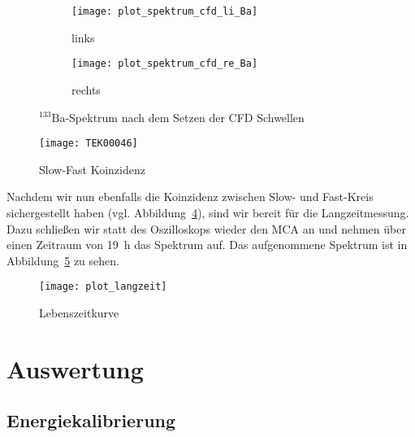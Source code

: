 \documentclass[11pt, ngerman, fleqn, DIV=15, headinclude, BCOR=2cm]{scrreprt}
\begin{document}
\begin{figure}
	\centering
	\begin{subfigure}{0.49 \textwidth}
		\texttt{[image: plot\_spektrum\_cfd\_li\_Ba]}
		\caption{%
			links
		}
		\label{fig:ba_fast_signal_cfd_plot-li}
	\end{subfigure}
	\begin{subfigure}{0.49 \textwidth}
		\texttt{[image: plot\_spektrum\_cfd\_re\_Ba]}
		\caption{%
			rechts
		}
		\label{fig:ba_fast_signal_cfd_plot-re}
	\end{subfigure}
	\caption{%
		$^{133}\text{Ba}$-Spektrum nach dem Setzen der CFD Schwellen
	}
	\label{fig:ba_fast_signal_cfd_plot}
\end{figure}

\begin{figure}
	\centering
	\texttt{[image: TEK00046]}
	\caption{%
		Slow-Fast Koinzidenz
	}
	\label{fig:ba_slow_fast_koinzidenz}
\end{figure}

Nachdem wir nun ebenfalls die Koinzidenz zwischen Slow- und Fast-Kreis
sichergestellt haben (vgl. Abbildung~\ref{fig:ba_slow_fast_koinzidenz}), sind
wir bereit für die Langzeitmessung. Dazu schließen wir statt des Oszilloskops
wieder den MCA an und nehmen über einen Zeitraum von \SI{19}{\hour} das
Spektrum auf. Das aufgenommene Spektrum ist in
Abbildung~\ref{fig:langzeit_plot} zu sehen.

\begin{figure}
	\centering
	\texttt{[image: plot\_langzeit]}
	\caption{%
		Lebenszeitkurve
	}
	\label{fig:langzeit_plot}
\end{figure}

\clearpage
\chapter{Auswertung}
\section{Energiekalibrierung}
\end{document}

